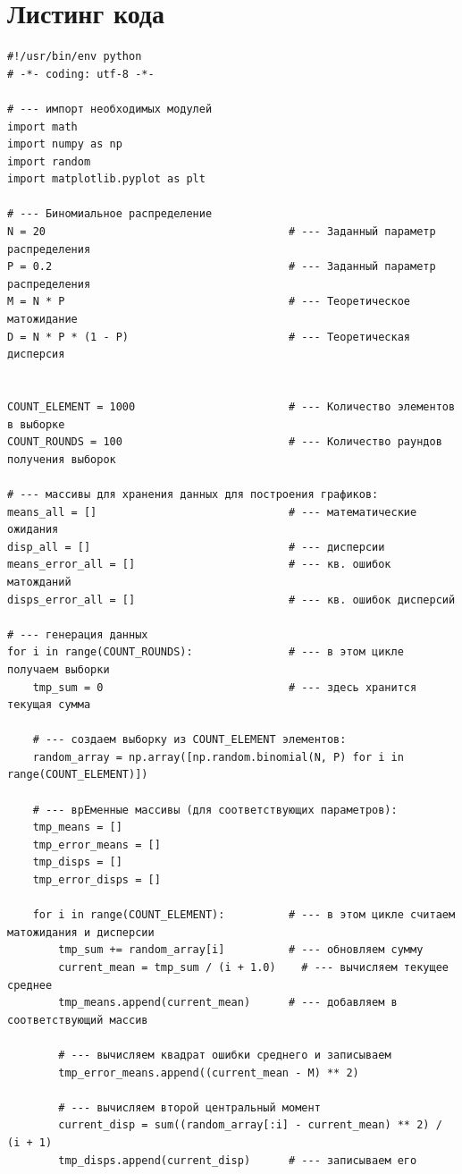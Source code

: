 \documentclass[a4paper,12pt,answers,noaddpoints]{exam}
\begin{document}
\section{Листинг кода}
\begin{verbatim}
#!/usr/bin/env python
# -*- coding: utf-8 -*-

# --- импорт необходимых модулей
import math
import numpy as np
import random
import matplotlib.pyplot as plt

# --- Биномиальное распределение
N = 20                                      # --- Заданный параметр распределения
P = 0.2                                     # --- Заданный параметр распределения
M = N * P                                   # --- Теоретическое матожидание
D = N * P * (1 - P)                         # --- Теоретическая дисперсия


COUNT_ELEMENT = 1000                        # --- Количество элементов в выборке
COUNT_ROUNDS = 100                          # --- Количество раундов получения выборок

# --- массивы для хранения данных для построения графиков:
means_all = []                              # --- математические ожидания
disp_all = []                               # --- дисперсии
means_error_all = []                        # --- кв. ошибок матожданий
disps_error_all = []                        # --- кв. ошибок дисперсий

# --- генерация данных
for i in range(COUNT_ROUNDS):               # --- в этом цикле получаем выборки
    tmp_sum = 0                             # --- здесь хранится текущая сумма

    # --- создаем выборку из COUNT_ELEMENT элементов:
    random_array = np.array([np.random.binomial(N, P) for i in range(COUNT_ELEMENT)])

    # --- врЕменные массивы (для соответствующих параметров):
    tmp_means = []
    tmp_error_means = []
    tmp_disps = []
    tmp_error_disps = []

    for i in range(COUNT_ELEMENT):          # --- в этом цикле считаем матожидания и дисперсии
        tmp_sum += random_array[i]          # --- обновляем сумму
        current_mean = tmp_sum / (i + 1.0)    # --- вычисляем текущее среднее
        tmp_means.append(current_mean)      # --- добавляем в соответствующий массив

        # --- вычисляем квадрат ошибки среднего и записываем
        tmp_error_means.append((current_mean - M) ** 2)

        # --- вычисляем второй центральный момент
        current_disp = sum((random_array[:i] - current_mean) ** 2) / (i + 1)
        tmp_disps.append(current_disp)      # --- записываем его


\end{verbatim}
\end{document}
